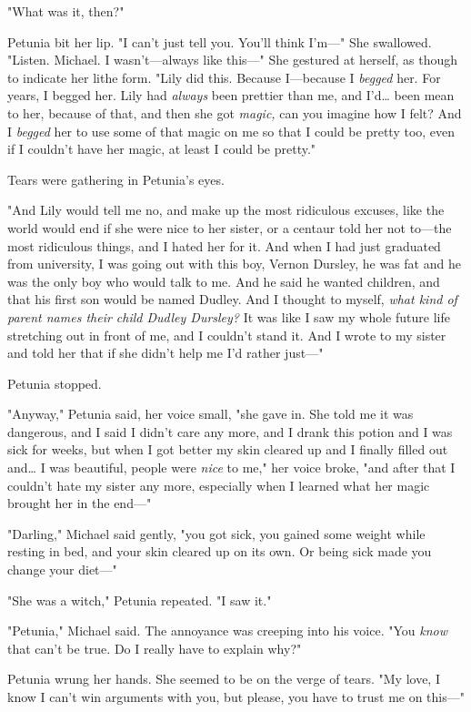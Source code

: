 "What was it, then?"

Petunia bit her lip. "I can't just tell you. You'll think I'm---" She 
swallowed. "Listen. Michael. I wasn't---always like this---" She gestured at 
herself, as though to indicate her lithe form. "Lily did this. Because 
I---because I \emph{begged} her. For years, I begged her. Lily had 
\emph{always} been prettier than me, and I'd{\ldots} been mean to her, because 
of that, and then she got \emph{magic,} can you imagine how I felt? And I 
\emph{begged} her to use some of that magic on me so that I could be pretty 
too, even if I couldn't have her magic, at least I could be pretty."

Tears were gathering in Petunia's eyes.

"And Lily would tell me no, and make up the most ridiculous excuses, like the 
world would end if she were nice to her sister, or a centaur told her not 
to---the most ridiculous things, and I hated her for it. And when I had just 
graduated from university, I was going out with this boy, Vernon Dursley, he 
was fat and he was the only boy who would talk to me. And he said he wanted 
children, and that his first son would be named Dudley. And I thought to 
myself, \emph{what kind of parent names their child Dudley Dursley?} It was 
like I saw my whole future life stretching out in front of me, and I couldn't 
stand it. And I wrote to my sister and told her that if she didn't help me I'd 
rather just---"

Petunia stopped.

"Anyway," Petunia said, her voice small, "she gave in. She told me it was 
dangerous, and I said I didn't care any more, and I drank this potion and I was 
sick for weeks, but when I got better my skin cleared up and I finally filled 
out and{\ldots} I was beautiful, people were \emph{nice} to me," her voice 
broke, "and after that I couldn't hate my sister any more, especially when I 
learned what her magic brought her in the end---"

"Darling," Michael said gently, "you got sick, you gained some weight while 
resting in bed, and your skin cleared up on its own. Or being sick made you 
change your diet---"

"She was a witch," Petunia repeated. "I saw it."

"Petunia," Michael said. The annoyance was creeping into his voice. "You 
\emph{know} that can't be true. Do I really have to explain why?"

Petunia wrung her hands. She seemed to be on the verge of tears. "My love, I 
know I can't win arguments with you, but please, you have to trust me on 
this---"


